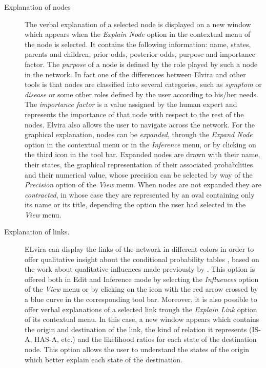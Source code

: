 \begin{description}
\item [Explanation of nodes] The verbal explanation of a selected node
is displayed on a new window which appears when the \emph{Explain
Node} option in the contextual menu of the node is selected. It
contains the following information: name, states, parents and
children, prior odds, posterior odds, purpose and importance
factor. The \emph{purpose} of a node is defined by the role played
by such a node in the network. In fact one of the differences
between Elvira and other tools is that nodes are classified into
several categories, such as \textit{symptom} or \textit{disease}
or some other roles defined by the user according to his/her
needs. The \emph{importance factor} is a value assigned by the
human expert and represents the importance of that node with
respect to the rest of the nodes. Elvira also allows the user to
navigate across the network. For the graphical explanation, nodes
can be \emph{expanded}, through the \emph{Expand Node} option in
the contextual menu or in the \emph{Inference} menu, or by
clicking on the third icon in the tool bar. Expanded nodes are
drawn with their name, their states, the graphical representation
of their associated probabilities and their numerical value, whose
precision can be selected by way of the \emph{Precision} option of
the \emph{View} menu. When nodes are not expanded they are
\emph{contracted}, in whose case they are represented by an oval
containing only its name or its title, depending the option the
user had selected in the \emph{View} menu.
\item [Explanation of links.] ELvira can display the
links of the network in different colors in order to offer
qualitative insight about the conditional probability tables
\cite{lacave03e}, based on the work about qualitative influences
made previously by \cite{Wellman90a}. This option is offered both
in Edit and Inference mode by selecting the \emph{Influences}
option of the \emph{View }menu or by clicking on the icon with the
red arrow crossed by a blue curve in the corresponding tool bar.
Moreover, it is also possible to offer verbal explanations of a
selected link trough the \emph{Explain Link} option of its
contextual menu. In this case, a new window appears which contains
the origin and destination of the link, the kind of relation it
represents (IS-A, HAS-A, etc.) and the likelihood ratios for each
state of the destination node. This option allows the user to
understand the states of the origin which better explain each
state of the destination.

\end{description}
